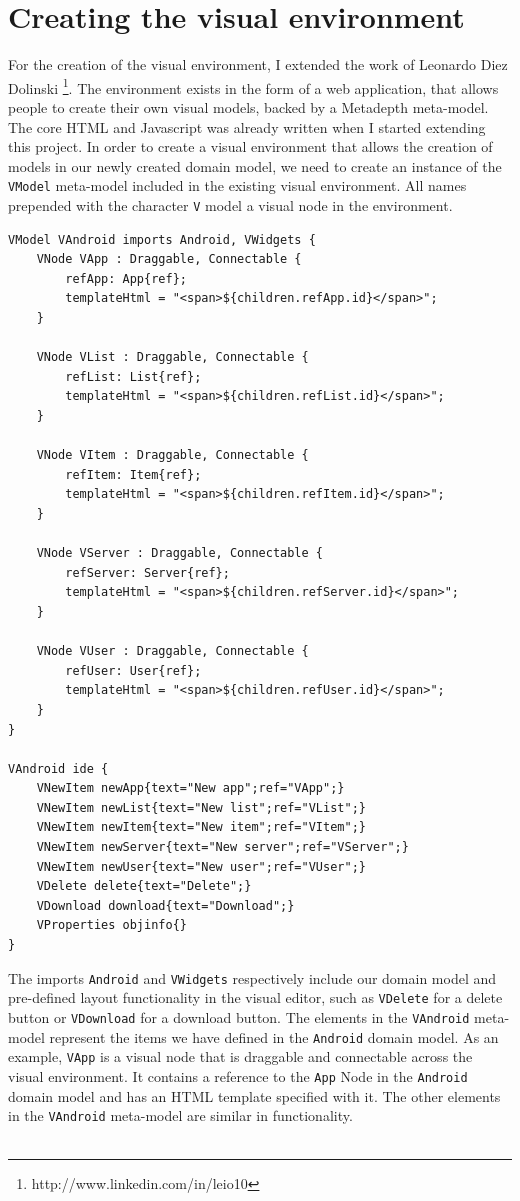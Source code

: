 \section{Creating the visual environment}

For the creation of the visual environment, I extended the work of Leonardo Diez Dolinski \footnote{http://www.linkedin.com/in/leio10}. The environment exists in the form of a web application, that allows people to create their own visual models, backed by a Metadepth meta-model. The core HTML and Javascript was already written when I started extending this project. In order to create a visual environment that allows the creation of models in our newly created domain model, we need to create an instance of the \texttt{VModel} meta-model included in the existing visual environment. All names prepended with the character \texttt{V} model a visual node in the environment. 
\begin{lstlisting}[label=visual-mm,caption=Domain meta-model, captionpos=t]
VModel VAndroid imports Android, VWidgets {
	VNode VApp : Draggable, Connectable {
        refApp: App{ref};
        templateHtml = "<span>${children.refApp.id}</span>";
    }

    VNode VList : Draggable, Connectable {
    	refList: List{ref};
    	templateHtml = "<span>${children.refList.id}</span>";
    }

	VNode VItem : Draggable, Connectable {
    	refItem: Item{ref};
    	templateHtml = "<span>${children.refItem.id}</span>";
    }

    VNode VServer : Draggable, Connectable {
        refServer: Server{ref};
        templateHtml = "<span>${children.refServer.id}</span>";
    }

    VNode VUser : Draggable, Connectable {
    	refUser: User{ref};
    	templateHtml = "<span>${children.refUser.id}</span>";
    }
}

VAndroid ide {
	VNewItem newApp{text="New app";ref="VApp";}
    VNewItem newList{text="New list";ref="VList";}
    VNewItem newItem{text="New item";ref="VItem";}
    VNewItem newServer{text="New server";ref="VServer";}
    VNewItem newUser{text="New user";ref="VUser";}
    VDelete delete{text="Delete";}
    VDownload download{text="Download";}
    VProperties objinfo{}
}
\end{lstlisting}
The imports \texttt{Android} and \texttt{VWidgets} respectively include our domain model and pre-defined layout functionality in the visual editor, such as \texttt{VDelete} for a delete button or \texttt{VDownload} for a download button. The elements in the \texttt{VAndroid} meta-model represent the items we have defined in the \texttt{Android} domain model. As an example, \texttt{VApp} is a visual node that is draggable and connectable across the visual environment. It contains a reference to the \texttt{App} Node in the \texttt{Android} domain model and has an HTML template specified with it. The other elements in the \texttt{VAndroid} meta-model are similar in functionality. \\ \\
